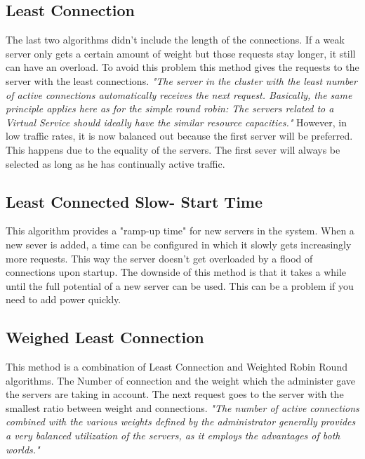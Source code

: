 \documentclass[12p]{article}
\begin{document}
	\subsection{Least Connection}
	The last two algorithms didn't include the length of the connections. If a weak server only gets a certain amount of weight but those requests stay longer, it still can have an overload. To avoid this problem this method gives the requests to the server with the least connections. \textit{"The server  in the cluster with the least number of active connections automatically receives the next  request. Basically, the same principle applies here as for the simple round robin: The servers  related to a Virtual Service should ideally have the similar resource capacities."} \cite{schedu} However, in low traffic rates, it is now balanced out because the first server will be preferred. This happens due to the equality of the servers. The first sever will always be selected as long as he has continually active traffic. 
	
	\subsection{Least Connected Slow- Start Time}
	This algorithm provides a "ramp-up time" for new servers in the system. When a new sever is added, a time can be configured in which it slowly gets increasingly more requests. This way the server doesn't get overloaded by a flood of connections upon startup. The downside of this method is that it takes a while until the full potential of a new server can be used. This can be a problem if you need to add power quickly. 
	
	\subsection{Weighed Least Connection}
	This method is a combination of Least Connection and Weighted Robin Round algorithms. The Number of connection and the weight which the administer gave the servers are taking in account. The next request goes to the server with the smallest ratio between weight and connections. \textit{"The number of active connections combined with the various weights defined by the  administrator generally provides a very balanced utilization of the servers, as it employs the  advantages of both worlds."}\cite{schedu}
	
\end{document}
